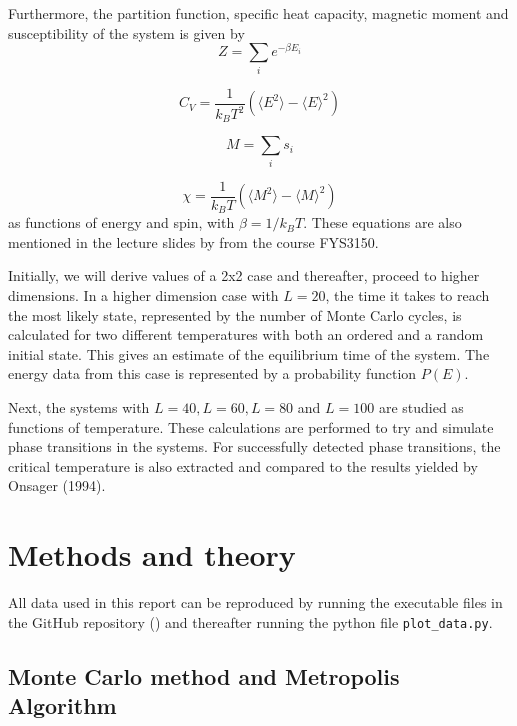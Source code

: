 \documentclass[12pt,english,a4paper]{article}
\begin{document}
Furthermore, the partition function, specific heat capacity, magnetic moment and susceptibility of the system is given by
\begin{equation}
Z=\sum_i e^{-\beta E_i} \label{eq:partition} 
\end{equation}

\begin{equation}
C_V=\frac{1}{k_B T^2}\left(\langle E^2\rangle-\langle E\rangle^2\right)
\end{equation}

\begin{equation}
M=\sum_is_i
\end{equation}

\begin{equation}
\chi= \frac{1}{k_B T}\left(\langle M^2\rangle-\langle M\rangle^2\right)
\end{equation}
as functions of energy and spin, with $\beta =1/k_B T$. These equations are also mentioned in the lecture slides by \cite{LectureIsing} from the course FYS3150.

Initially, we will derive values of a 2x2 case and thereafter, proceed to higher dimensions. In a higher dimension case with $L=20$, the time it takes to reach the most likely state, represented by the number of Monte Carlo cycles, is calculated for two different temperatures with both an ordered and a random initial state. This gives an estimate of the equilibrium time of the system. The energy data from this case is represented by a probability function $P(E)$. 

Next, the systems with $L=40, L=60, L=80$ and $L=100$ are studied as functions of temperature. These calculations are performed to try and simulate phase transitions in the systems. For successfully detected phase transitions, the critical temperature is also extracted and compared to the results yielded by Onsager (1994).

\section{Methods and theory} \label{methods_and_theory}

All data used in this report can be reproduced by running the executable files in the GitHub repository (\cite{GitHub}) and thereafter running the python file \texttt{plot\_data.py}.

\subsection{Monte Carlo method and Metropolis Algorithm}
\end{document}
